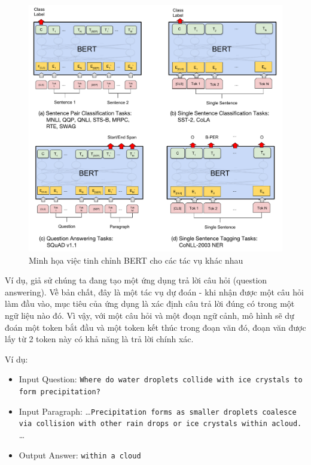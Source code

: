 \begin{figure}[htb]
    \centering
    \includegraphics[width=\textwidth]{image/BERT_fine_tune.pdf}
    \caption{Minh họa việc tinh chỉnh BERT cho các tác vụ khác nhau \cite{47751}}
    \label{figure:BERT_fine_tuning}
\end{figure}

Ví dụ, giả sử chúng ta đang tạo một ứng dụng trả lời câu hỏi (question answering). Về bản chất, đây là một tác vụ dự đoán - khi nhận được một câu hỏi làm đầu vào, mục tiêu của ứng dụng là xác định câu trả lời đúng có trong một ngữ liệu nào đó. Vì vậy, với một câu hỏi và một đoạn ngữ cảnh, mô hình sẽ dự đoán một token bắt đầu và một token kết thúc trong đoạn văn đó, đoạn văn được lấy từ 2 token này có khả năng là trả lời chính xác.

Ví dụ:

\begin{itemize}
    \item Input Question:
          {\tt Where do water droplets collide with ice crystals to form precipitation?}

    \item Input Paragraph:
          \dots {\tt Precipitation forms as smaller droplets coalesce via collision with other rain drops or ice crystals within a\newline cloud.} \dots

    \item Output Answer:
          {\tt within a cloud}
\end{itemize}


